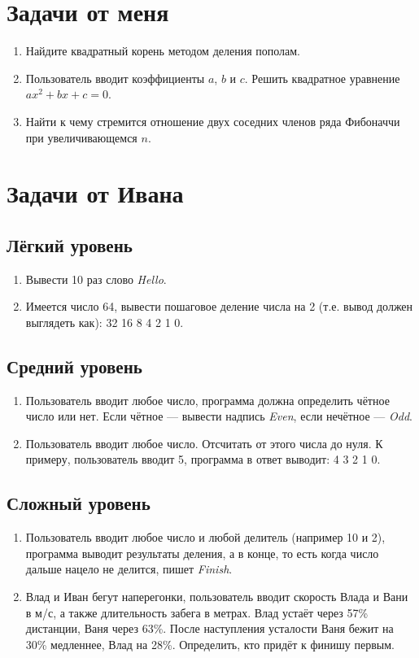 \documentclass[12pt]{article}
\begin{document}
\section{Задачи от меня}

\begin{enumerate}
 \item Найдите квадратный корень методом деления пополам.
 \item Пользователь вводит коэффициенты $a$, $b$ и $c$. Решить квадратное уравнение $ax^2 + bx + c = 0$.
 \item Найти к чему стремится отношение двух соседних членов ряда Фибоначчи при увеличивающемся $n$.
\end{enumerate}

\section{Задачи от Ивана}

\subsection*{Лёгкий уровень}
\begin{enumerate}
 \item Вывести 10 раз слово \textit{Hello}.
 \item Имеется число 64, вывести пошаговое деление числа на 2 (т.е. вывод должен выглядеть как):
32
16
8
4
2
1
0.
\end{enumerate}

\subsection*{Средний уровень}
\begin{enumerate}
\item Пользователь вводит любое число, программа должна определить чётное число или нет. Если чётное --- вывести надпись \textit{Even}, если нечётное --- \textit{Odd}.
\item Пользователь вводит любое число. Отсчитать от этого числа до нуля. К примеру, пользователь вводит 5, программа в ответ выводит:
4
3
2
1
0.
\end{enumerate}

\subsection*{Сложный уровень}
\begin{enumerate}
 \item Пользователь вводит любое число и любой делитель (например 10 и 2), программа выводит результаты деления, а в конце, то есть когда число дальше нацело не делится, пишет \textit{Finish}.
 \item Влад и Иван бегут наперегонки, пользователь вводит скорость Влада и Вани в м/с, а также длительность забега в метрах. Влад устаёт через 57\% дистанции, Ваня через 63\%. После наступления усталости Ваня бежит на 30\% медленнее, Влад на 28\%. Определить, кто придёт к финишу первым.
\end{enumerate}
\end{document}
